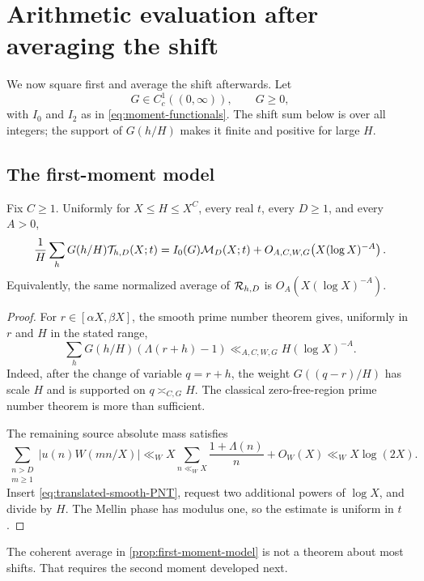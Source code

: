 \section{Arithmetic evaluation after averaging the shift}
\label{sec:averaged-energy}

We now square first and average the shift afterwards.  Let
\[
 G\in C_c^1((0,\infty)),\qquad G\geq0,
\]
with $I_0$ and $I_2$ as in \eqref{eq:moment-functionals}.
The shift sum below is over all integers; the support of $G(h/H)$ makes it
finite and positive for large $H$.

\subsection{The first-moment model}

\begin{proposition}
\label{prop:first-moment-model}
Fix $C\geq1$.  Uniformly for $X\leq H\leq X^C$, every real $t$, every
$D\geq1$, and every $A>0$,
\begin{equation}
 \frac1H\sum_hG(h/H)\mathcal T_{h,D}(X;t)
 =I_0(G)\mathcal M_D(X;t)+O_{A,C,W,G}\!\left(X(\log X)^{-A}\right).
 \label{eq:first-moment-model}
\end{equation}
Equivalently, the same normalized average of $\mathcal R_{h,D}$ is
$O_A(X(\log X)^{-A})$.
\end{proposition}

\begin{proof}
For $r\in[\alpha X,\beta X]$, the smooth prime number theorem gives,
uniformly in $r$ and $H$ in the stated range,
\begin{equation}
 \sum_hG(h/H)(\Lambda(r+h)-1)
 \ll_{A,C,W,G}H(\log X)^{-A}.
 \label{eq:translated-smooth-PNT}
\end{equation}
Indeed, after the change of variable $q=r+h$, the weight
$G((q-r)/H)$ has scale $H$ and is supported on $q\asymp_{C,G}H$.
The classical zero-free-region prime number theorem is more than
sufficient.

The remaining source absolute mass satisfies
\[
 \sum_{\substack{n>D\\m\geq1}}|u(n)W(mn/X)|
 \ll_W X\sum_{n\ll_W X}\frac{1+\Lambda(n)}n+O_W(X)
 \ll_W X\log(2X).
\]
Insert \eqref{eq:translated-smooth-PNT}, request two additional powers of
$\log X$, and divide by $H$.  The Mellin phase has modulus one, so the
estimate is uniform in $t$.
\end{proof}

The coherent average in \cref{prop:first-moment-model} is not a theorem
about most shifts.  That requires the second moment developed next.


